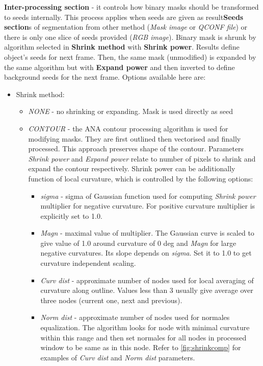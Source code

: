 \documentclass[a4paper,12pt]{article}
\begin{document}
\textbf{Inter-processing section} - it controls how binary masks should be transformed to seeds internally. This process applies when seeds are given as result\textbf{Seeds section}s of segmentation from other method (\textit{Mask image} or \textit{QCONF file}) or there is only one slice of seeds provided (\textit{RGB image}). Binary mask is shrunk by algorithm selected in \textbf{Shrink method} with \textbf{Shrink power}. Results define object's seeds for next frame. Then, the same mask (unmodified) is expanded by the same algorithm but with \textbf{Expand power} and then inverted to define background seeds for the next frame. Options available here are:
\begin{itemize}
	\item Shrink method:
	\begin{itemize}
		\item \textit{NONE} - no shrinking or expanding. Mask is used directly as seed
		\item \textit{CONTOUR} - the ANA contour processing algorithm is used for modifying masks. They are first outlined then vectorised and finally processed. This approach preserves shape of the contour. Parameters \textit{Shrink power} and \textit{Expand power} relate to number of pixels to shrink and expand the contour respectively. Shrink power can be additionally function of local curvature, which is controlled by the following options:
		\begin{itemize}
			\item \textit{sigma} - sigma of Gaussian function used for computing \textit{Shrink power} multiplier for negative curvature. For positive curvature multiplier is explicitly set to 1.0. 
			\item \textit{Magn} - maximal value of multiplier. The Gaussian curve is scaled to give value of 1.0 around curvature of 0 deg and \textit{Magn} for large negative curvatures. Its slope depends on \textit{sigma}. Set it to 1.0 to get curvature independent scaling.
			\item \textit{Curv dist} - approximate number of nodes used for local averaging of curvature along outline. Values less than 3 usually give average over three nodes (current one, next and previous).
			\item \textit{Norm dist} - approximate number of nodes used for normales equalization. The algorithm looks for node with minimal curvature within this range and then set normales for all nodes in processed window to be same as in this node. Refer to \autoref{fig:shrinkcomp} for examples of \textit{Curv dist} and \textit{Norm dist} parameters.  

\end{itemize}
\end{itemize}
\end{itemize}
\end{document}

